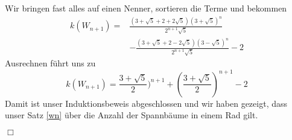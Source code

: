 Wir bringen fast alles auf einen Nenner, sortieren die Terme und bekommen
\begin{equation}
\begin{aligned}
\mathit{k}(W_{n+1}) = {}  & \frac{(3+\sqrt{5}+2+2\sqrt{5})(3+\sqrt{5})^{n}}{2^{n+1}\sqrt{5}} \\%
                        & -\frac{(3+\sqrt{5}+2-2\sqrt{5})(3-\sqrt{5})^{n}}{2^{n+1}\sqrt{5}}-2 
\end{aligned}
\end{equation}
Ausrechnen führt uns zu\\
\begin{equation}
\mathit{k}(W_{n+1}) = \frac{3+\sqrt{5}}{2})^{n+1}+(\frac{3+\sqrt{5}}{2})^{n+1}-2
\end{equation}
Damit ist unser Induktionsbeweis abgeschlossen und wir haben gezeigt, dass unser Satz \ref{wn} über die Anzahl der Spannbäume in einem Rad gilt.
\begin{flushright} $\Box$ \end{flushright} 
